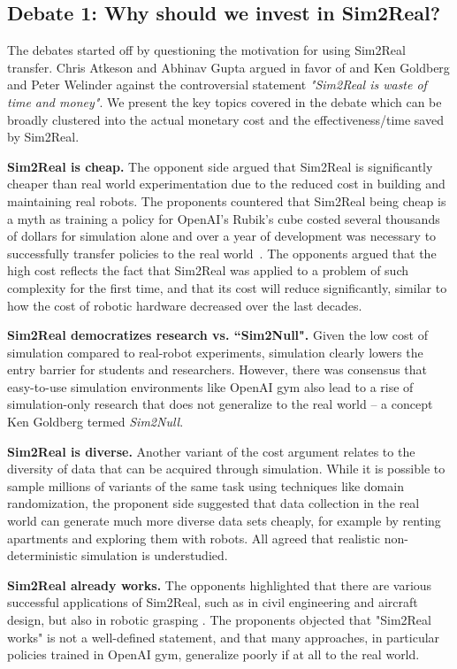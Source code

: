 \subsection{Debate 1: Why should we invest in Sim2Real?}

The debates started off by questioning the motivation for using Sim2Real transfer. Chris Atkeson and Abhinav Gupta argued in favor of and Ken Goldberg and Peter Welinder against the controversial statement \emph{"Sim2Real is waste of time and money"}. We present the key topics covered in the debate which can be broadly clustered into the actual monetary cost and the effectiveness/time saved by Sim2Real. 

\textbf{Sim2Real is cheap.}
The opponent side argued that Sim2Real is significantly cheaper than real world experimentation due to the reduced cost in building and maintaining real robots. The proponents countered that Sim2Real being cheap is a myth as training a policy for OpenAI's Rubik's cube costed several thousands of dollars for simulation alone and over a year of development was necessary to successfully transfer policies to the real world~\cite{Openai2019:Solving}. The opponents argued that the high cost reflects the fact that Sim2Real was applied to a problem of such complexity for the first time, and that its cost will reduce significantly, similar to how the cost of robotic hardware decreased over the last decades.

\textbf{Sim2Real democratizes research vs. ``Sim2Null".} Given the low cost of simulation compared to real-robot experiments, simulation clearly lowers the entry barrier for students and researchers. However, there was consensus that easy-to-use simulation environments like OpenAI gym also lead to a rise of simulation-only research that does not generalize to the real world -- a concept Ken Goldberg termed \emph{Sim2Null}.

\textbf{Sim2Real is diverse.}
Another variant of the cost argument relates to the diversity of data that can be acquired through simulation. While it is possible to sample millions of variants of the same task using techniques like domain randomization, the proponent side suggested that data collection in the real world can generate much more diverse data sets cheaply, for example by renting apartments and exploring them with robots. All agreed that realistic non-deterministic simulation is understudied.

\textbf{Sim2Real already works.}
The opponents highlighted that there are various successful applications of Sim2Real, such as in civil engineering and aircraft design, but also in robotic grasping \cite{mahler_learning_2019}. The proponents objected that "Sim2Real works" is not a well-defined statement, and that many approaches, in particular policies trained in OpenAI gym, generalize poorly if at all to the real world.

